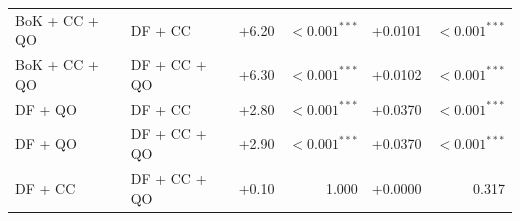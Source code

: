 \begin{table}[!tbh]
{\begin{tabular}{llrrrr}
BoK + CC + QO & DF + CC & +6.20 & $<\!0.001^{***}$ & +0.0101 & $<\!0.001^{***}$ \\
BoK + CC + QO & DF + CC + QO & +6.30 & $<\!0.001^{***}$ & +0.0102 & $<\!0.001^{***}$ \\
DF + QO & DF + CC & +2.80 & $<\!0.001^{***}$ & +0.0370 & $<\!0.001^{***}$ \\
DF + QO & DF + CC + QO & +2.90 & $<\!0.001^{***}$ & +0.0370 & $<\!0.001^{***}$ \\
DF + CC & DF + CC + QO & +0.10 & 1.000 & +0.0000 & 0.317 \\
\bottomrule
\end{tabular}%
}
\end{table}
